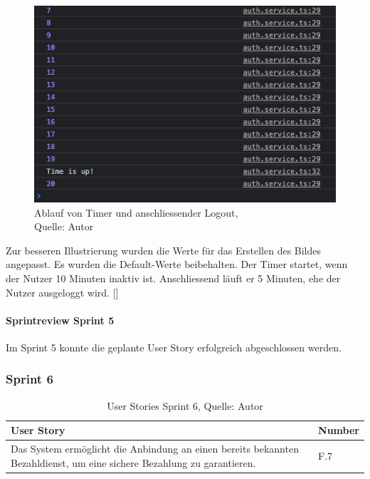  \begin{figure}[H]
 	\centering
 	\includegraphics[scale=0.5]{images/idle.PNG}
 	\caption[Ablauf von Timer und anschliessender Logout]{Ablauf von Timer und anschliessender Logout,\\ Quelle: Autor}
 	\label{img: autoLogout}
 \end{figure} 
Zur besseren Illustrierung wurden die Werte für das Erstellen des Bildes angepasst. 
Es wurden die Default-Werte beibehalten. Der Timer startet, wenn der Nutzer 10 Minuten inaktiv ist. Anschliessend läuft er 5 Minuten, ehe der Nutzer ausgeloggt wird. [\cite{idle}]
 
\paragraph{Sprintreview Sprint 5}
 Im Sprint 5 konnte die geplante User Story erfolgreich abgeschlossen werden.
 
\subsubsection{Sprint 6}
\begin{table}[H]
	\setlength\extrarowheight{2pt} %
	\begin{tabularx}{\textwidth}{|X|l|}
		\hline
		\textbf{User Story} & \textbf{Number} \\
		\hline
		Das System ermöglicht die Anbindung an einen bereits bekannten Bezahldienst, 
		um eine sichere Bezahlung zu garantieren.& F.7\\
		\hline
	\end{tabularx} 
	\caption[User Stories Sprint 6]{User Stories Sprint 6, Quelle: Autor}
\end{table}\label{userStoriesSprint6}
